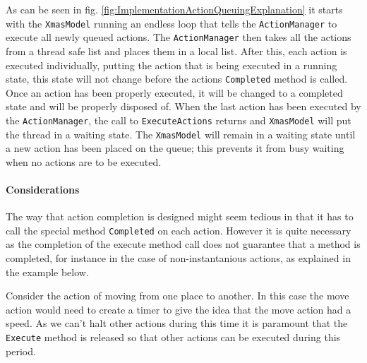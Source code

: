 As can be seen in fig. \ref{fig:ImplementationActionQueuingExplanation}
it starts with the \texttt{XmasModel} running an endless loop that
tells the \texttt{ActionManager} to execute all newly queued actions.
The \texttt{ActionManager} then takes all the actions from a thread
safe list and places them in a local list. After this, each action
is executed individually, putting the action that is being executed
in a running state, this state will not change before the actions
\texttt{Completed} method is called. Once an action has been properly
executed, it will be changed to a completed state and will be properly
disposed of. When the last action has been executed by the \texttt{ActionManager},
the call to \texttt{ExecuteActions} returns and \texttt{XmasModel}
will put the thread in a waiting state. The \texttt{XmasModel} will
remain in a waiting state until a new action has been placed on the
queue; this prevents it from busy waiting when no actions are to be
executed.


\paragraph*{Considerations}

The way that action completion is designed might seem tedious in that
it has to call the special method \texttt{Completed} on each action.
However it is quite necessary as the completion of the execute method
call does not guarantee that a method is completed, for instance in
the case of non-instantanious actions, as explained in the example
below. 

Consider the action of moving from one place to another. In this case
the move action would need to create a timer to give the idea that
the move action had a speed. As we can\textquoteright{}t halt other
actions during this time it is paramount that the \texttt{Execute}
method is released so that other actions can be executed during this
period. 

